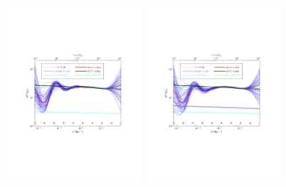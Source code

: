\documentclass[11pt]{article}
\def \halffigwidth{0.45\textwidth}
\begin{document}
\begin{figure}
  \includegraphics[width=\halffigwidth,  trim = 1in 2.9in 1in 2.9in]{nobicep_spline0_p11_r0d02_power_traj.pdf}%
  \includegraphics[width=\halffigwidth,  trim = 1in 2.9in 1in 2.9in]{nobicep_spline0_p11_r0d2_power_traj.pdf}

\end{figure}
\end{document}
